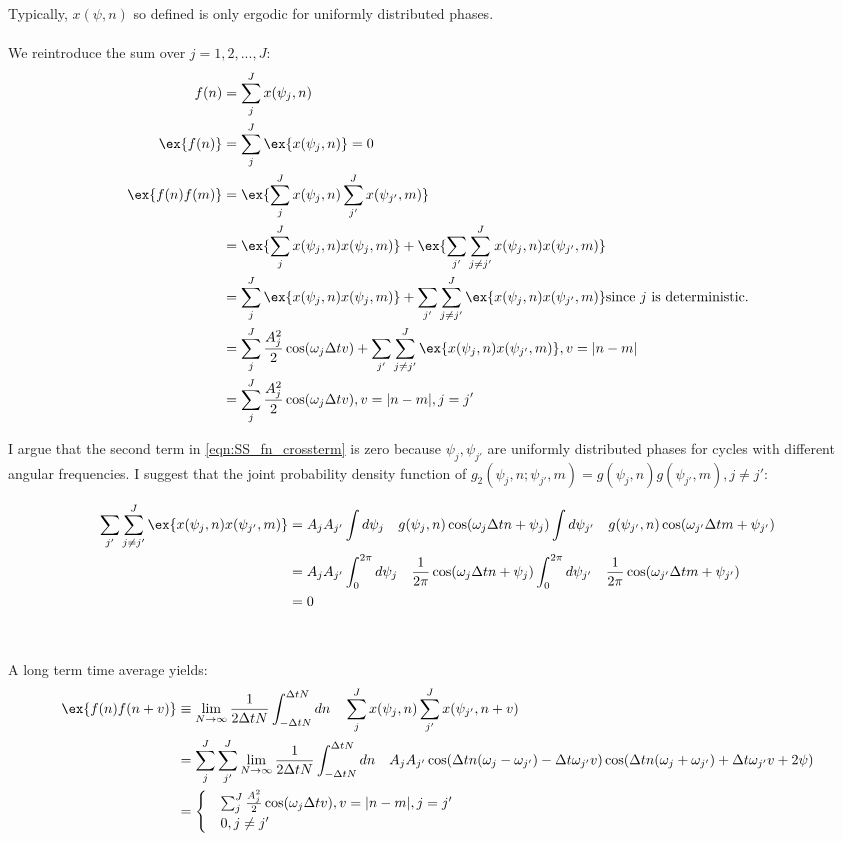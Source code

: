 Typically, $x(\psi, n)$ so defined is only ergodic for uniformly distributed phases. 
\\
\\
We reintroduce the sum over $j = 1, 2, ... , J$:
\begin{align}
f(n) & = \sum_j^J x(\psi_j, n) \\
\ex{f(n)} &= \sum_j^J \ex{x(\psi_j, n)} = 0 \\
\ex{f(n)f(m)} &=  \ex{\sum_j^J x(\psi_j, n) \sum_{j'}^{J} x(\psi_{j'}, m)}  \\
 & = \ex{\sum_j^J x(\psi_j, n) x(\psi_{j}, m)} + \ex{\sum_{j'}\sum_{j\neq j'}^J x(\psi_j, n) x(\psi_{j'}, m)} \\
  & = \sum_j^J \ex{x(\psi_j, n) x(\psi_{j}, m)} + \sum_{j'}\sum_{j\neq j'}^J \ex{x(\psi_j, n) x(\psi_{j'}, m)}  \text{since $j$ is deterministic.}\\
 & = \sum_j^J \frac{A_j^2}{2} \cos(\omega_j \Delta t v) + \sum_{j'}\sum_{j\neq j'}^J \ex{x(\psi_j, n) x(\psi_{j'}, m)}, v = |n - m |  \label{eqn:SS_fn_crossterm}\\
 & = \sum_j^J \frac{A_j^2}{2} \cos(\omega_j \Delta t v), v = |n - m |, j = j'
\end{align}
 
 I argue that the second term in \ref{eqn:SS_fn_crossterm} is zero because $\psi_j, \psi_{j'}$ are uniformly distributed phases for cycles with different angular frequencies.
 I suggest that the joint probability density function of $ g_2(\psi_j, n; \psi_{j'}, m) = g(\psi_j, n) g(\psi_{j'}, m), j \neq j'$:

\begin{align}
\sum_{j'}\sum_{j\neq j'}^J \ex{x(\psi_j, n) x(\psi_{j'}, m)} & = A_j A_{j'} \int d \psi_j \quad g(\psi_j, n) \cos(\omega_j \Delta t n + \psi_j) \int d \psi_{j'} \quad g(\psi_{j'}, n) \cos(\omega_{j'} \Delta t m + \psi_{j'}) \\
& = A_j A_{j'} \int_0^{2\pi} d \psi_j \quad \frac{1}{2\pi} \cos(\omega_j \Delta t n + \psi_j) \int_0^{2\pi} d \psi_{j'} \quad \frac{1}{2\pi}  \cos(\omega_{j'} \Delta t m + \psi_{j'}) \\
& = 0 
\end{align}
 \\
 \\
  A long term time average yields:
\begin{align}
\ex{f(n)f(n + v)} & \equiv \lim_{N \to \infty} \frac{1}{2 \Delta t N} \int_{-\Delta t N}^{\Delta t N} dn \quad  \sum_j^J x(\psi_j, n) \sum_{j'}^{J} x(\psi_{j'}, n + v) \\
&= \sum_j^J  \sum_{j'}^{J} \lim_{N \to \infty} \frac{1}{2 \Delta t N} \int_{-\Delta t N}^{\Delta t N} dn \quad   A_j A_{j'} \cos (\Delta t n(\omega_j - \omega_{j'}) - \Delta t \omega_{j'} v)  \cos (\Delta t n(\omega_j + \omega_{j'}) + \Delta t \omega_{j'} v + 2\psi)\\
&= \begin{cases}
& \sum_j^J \frac{A_j^2}{2} \cos(\omega_j \Delta t v), v = |n - m |, j = j' \\
& 0, j \neq j'
\end{cases}
\end{align}

